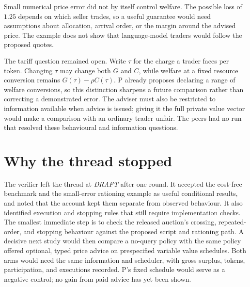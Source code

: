\documentclass{article}
\begin{document}
Small numerical price error did not by itself control welfare. The possible loss of \(1.25\) depends on
which seller trades, so a useful guarantee would need assumptions about allocation, arrival order, or the
margin around the advised price. The example does not show that language-model traders would follow the
proposed quotes.

The tariff question remained open. Write \(\tau\) for the charge a trader faces per token. Changing
\(\tau\) may change both \(G\) and \(C\), while welfare at a fixed resource conversion remains
\(G(\tau)-\rho C(\tau)\). P already proposes declaring a range of welfare conversions, so this
distinction sharpens a future comparison rather than correcting a demonstrated error. The adviser must
also be restricted to information available when advice is issued; giving it the full private value
vector would make a comparison with an ordinary trader unfair. The peers had no run that resolved these
behavioural and information questions.

\section{Why the thread stopped}

The verifier left the thread at \emph{DRAFT} after one round. It accepted the cost-free benchmark and the
small-error rationing example as useful conditional results, and noted that the account kept them
separate from observed behaviour. It also identified execution and stopping rules that still require
implementation checks. The smallest immediate step is to check the released auction's crossing,
repeated-order, and stopping behaviour against the proposed script and rationing path. A decisive next
study would then compare a no-query policy with the same policy offered optional, typed price advice on
prespecified variable value schedules. Both arms would need the same information and scheduler, with
gross surplus, tokens, participation, and executions recorded. P's fixed schedule would serve as a
negative control; no gain from paid advice has yet been shown.



\end{document}
